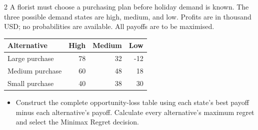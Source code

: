 \begin{multicols}{2}
A florist must choose a purchasing plan before holiday demand is known. The three possible demand states are high, medium, and low. Profits are in thousand USD; no probabilities are available. All payoffs are to be maximised.
\begin{center}\small\setlength{\tabcolsep}{4pt}
\begin{tabular}{@{}lrrr@{}}\toprule
Alternative&High&Medium&Low\\\midrule
Large purchase&78&32&-12\\
Medium purchase&60&48&18\\
Small purchase&40&38&30\\\bottomrule
\end{tabular}\end{center}
\begin{itemize}\item[\textbf{(C5)}] Construct the complete opportunity-loss table using each state's best payoff minus each alternative's payoff. Calculate every alternative's maximum regret and select the Minimax Regret decision. \end{itemize}
\end{multicols}
\clearpage
